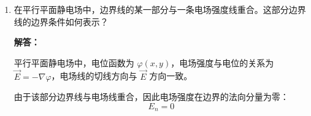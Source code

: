 \begin{enumerate}[label=\arabic*.]
\textbf{解答：}

设分界面为 \(z=0\) 平面，法向单位矢量 \(\vec{e}_n = \vec{e}_z\)，且分界面上无自由面电荷（\(\sigma_f=0\)）。

\vspace{0.5em}
1. 求区域1的电位移矢量 \(\vec{D}_1\)
\[
\vec{D}_1 = \varepsilon_1 \vec{E}_1 = \varepsilon_{r1}\varepsilon_0 \vec{E}_1
\]
代入 \(\vec{E}_1\)：
\[
\vec{D}_1 = \varepsilon_{r1}\varepsilon_0 (20\vec{e}_x - 10\vec{e}_y + 50\vec{e}_z)
\]

\vspace{0.5em}
2. 利用\textbf{分界面衔接条件}求 \(\vec{E}_2\)
\begin{itemize}
    \item 切向分量连续：\(\vec{E}_{2t} = \vec{E}_{1t} = 20\vec{e}_x - 10\vec{e}_y\)
    \item 法向分量连续：\(D_{2n} = D_{1n} = 50\varepsilon_{r1}\varepsilon_0\)
\end{itemize}

由 \(\vec{D}_2 = \varepsilon_{r2}\varepsilon_0 \vec{E}_2\)，得：
\[
E_{2n} = \frac{50\varepsilon_{r1}}{\varepsilon_{r2}}
\]

故：
\[
\vec{E}_2 = 20\vec{e}_x - 10\vec{e}_y + \frac{50\varepsilon_{r1}}{\varepsilon_{r2}} \vec{e}_z
\]

\vspace{0.5em}
3. 求区域2的电位移矢量 \(\vec{D}_2\)
\[
\vec{D}_2 = \varepsilon_{r2}\varepsilon_0 \vec{E}_2
= \varepsilon_{r2}\varepsilon_0 (20\vec{e}_x - 10\vec{e}_y) + 50\varepsilon_{r1}\varepsilon_0 \vec{e}_z
\]

最终结果：
\[
\vec{D}_1 = \varepsilon_{r1}\varepsilon_0 \left(20\vec{e}_x - 10\vec{e}_y + 50\vec{e}_z\right)
\]
\[
\vec{E}_2 = 20\vec{e}_x - 10\vec{e}_y + \frac{50\varepsilon_{r1}}{\varepsilon_{r2}} \vec{e}_z
\]
\[
\vec{D}_2 = \varepsilon_{r2}\varepsilon_0 (20\vec{e}_x - 10\vec{e}_y) + 50\varepsilon_{r1}\varepsilon_0 \vec{e}_z
\]

\vspace{1em}

\item 在平行平面静电场中，边界线的某一部分与一条电场强度线重合。这部分边界线的边界条件如何表示？

\textbf{解答：}

平行平面静电场中，电位函数为 \(\varphi(x,y)\)，电场强度与电位的关系为 \(\vec{E} = -\nabla\varphi\)，电场线的切线方向与 \(\vec{E}\) 方向一致。

由于该部分边界线与电场线重合，因此电场强度在边界的法向分量为零：
\[
E_n = 0
\]


\end{enumerate}
